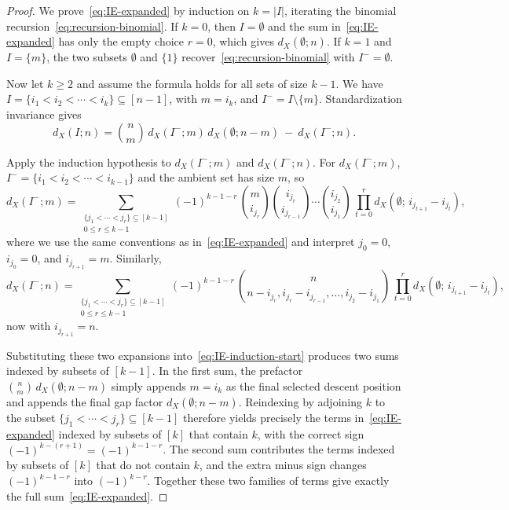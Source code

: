 \documentclass[12pt]{amsart}
\theoremstyle{definition}
\theoremstyle{remark}
\newcommand{\abs}[1]{\left|#1\right|}
\begin{document}
\begin{proof}
We prove~\eqref{eq:IE-expanded} by induction on \(k=\abs{I}\), iterating the binomial recursion~\eqref{eq:recursion-binomial}.
If \(k=0\), then \(I=\emptyset\) and the sum in~\eqref{eq:IE-expanded} has only the empty choice \(r=0\), which gives
\(d_X(\emptyset;n)\).
If \(k=1\) and \(I=\{m\}\), the two subsets \(\emptyset\) and \(\{1\}\) recover~\eqref{eq:recursion-binomial} with
\(I^-=\emptyset\).

Now let \(k\ge 2\) and assume the formula holds for all sets of size \(k-1\).
We have \(I=\{i_1<i_2<\cdots<i_k\}\subseteq[n-1]\), with \(m=i_k\), and \(I^-=I\setminus\{m\}\).
Standardization invariance gives
\begin{equation}\label{eq:IE-induction-start}
 d_X(I;n)=\binom{n}{m}\,d_X(I^-;m)\,d_X(\emptyset;n-m)\ -\ d_X(I^-;n).
\end{equation}

Apply the induction hypothesis to \(d_X(I^-;m)\) and \(d_X(I^-;n)\).
For \(d_X(I^-;m)\), $I^-=\{i_1<i_2<\cdots<i_{k-1}\}$ and the ambient set has size $m$, so
\[
d_X(I^-;m)
=
\sum_{\substack{\{j_1<\cdots<j_r\}\subseteq [k-1]\\ 0\le r\le k-1}}
(-1)^{k-1-r}\,
\binom{m}{i_{j_r}}\binom{i_{j_r}}{i_{j_{r-1}}}\cdots\binom{i_{j_2}}{i_{j_1}}\,
\prod_{t=0}^{r} d_X(\emptyset;\,i_{j_{t+1}}-i_{j_t}),
\]
where we use the same conventions as in~\eqref{eq:IE-expanded} and interpret \(j_0=0\), \(i_{j_0}=0\), and
\(i_{j_{r+1}}=m\).
Similarly,
\[
d_X(I^-;n)
=
\sum_{\substack{\{j_1<\cdots<j_r\}\subseteq [k-1]\\ 0\le r\le k-1}}
(-1)^{k-1-r}\,
\binom{n}{n-i_{j_r},i_{j_r}-i_{j_{r-1}},\ldots,i_{j_2}-i_{j_1}}\,
\prod_{t=0}^{r} d_X(\emptyset;\,i_{j_{t+1}}-i_{j_t}),
\]
now with \(i_{j_{r+1}}=n\).

Substituting these two expansions into~\eqref{eq:IE-induction-start} produces two sums indexed by subsets of \([k-1]\).
In the first sum, the prefactor \(\binom{n}{m}\,d_X(\emptyset;n-m)\) simply appends \(m=i_k\) as the final selected
descent position and appends the final gap factor \(d_X(\emptyset;n-m)\).  Reindexing by adjoining \(k\) to the subset
\(\{j_1<\cdots<j_r\}\subseteq[k-1]\) therefore yields precisely the terms in~\eqref{eq:IE-expanded} indexed by subsets of
\([k]\) that contain \(k\), with the correct sign \((-1)^{k-(r+1)}=(-1)^{k-1-r}\).
The second sum contributes the terms indexed by subsets of \([k]\) that do not contain \(k\), and the extra minus sign
changes \((-1)^{k-1-r}\) into \((-1)^{k-r}\).
Together these two families of terms give exactly the full sum~\eqref{eq:IE-expanded}.
\end{proof}
\end{document}

